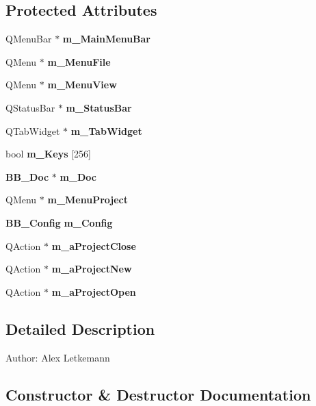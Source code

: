 \subsection*{Protected Attributes}
\begin{CompactItemize}
\item 
QMenu\-Bar $\ast$ {\bf m\_\-Main\-Menu\-Bar}
\item 
QMenu $\ast$ {\bf m\_\-Menu\-File}
\item 
QMenu $\ast$ {\bf m\_\-Menu\-View}
\item 
QStatus\-Bar $\ast$ {\bf m\_\-Status\-Bar}
\item 
QTab\-Widget $\ast$ {\bf m\_\-Tab\-Widget}
\item 
bool {\bf m\_\-Keys} [256]\label{classBB__MainWindow_p5}

\item 
{\bf BB\_\-Doc} $\ast$ {\bf m\_\-Doc}\label{classBB__MainWindow_p6}

\item 
QMenu $\ast$ {\bf m\_\-Menu\-Project}\label{classBB__MainWindow_p7}

\item 
{\bf BB\_\-Config} {\bf m\_\-Config}\label{classBB__MainWindow_p8}

\item 
QAction $\ast$ {\bf m\_\-a\-Project\-Close}\label{classBB__MainWindow_p9}

\item 
QAction $\ast$ {\bf m\_\-a\-Project\-New}\label{classBB__MainWindow_p10}

\item 
QAction $\ast$ {\bf m\_\-a\-Project\-Open}\label{classBB__MainWindow_p11}

\end{CompactItemize}


\subsection{Detailed Description}
\begin{Desc}
\item[Author:]Alex Letkemann\end{Desc}




\subsection{Constructor \& Destructor Documentation}

